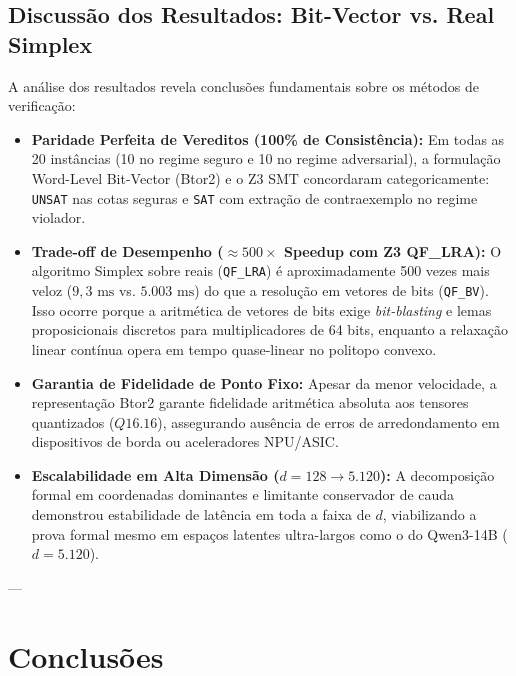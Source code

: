 \documentclass[11pt,a4paper]{article}
\theoremstyle{definition}
\begin{document}
\subsection{Discussão dos Resultados: Bit-Vector vs. Real Simplex}

A análise dos resultados revela conclusões fundamentais sobre os métodos de verificação:
\begin{itemize}
    \item \textbf{Paridade Perfeita de Vereditos (100\% de Consistência):} Em todas as 20 instâncias (10 no regime seguro e 10 no regime adversarial), a formulação Word-Level Bit-Vector (Btor2) e o Z3 SMT concordaram categoricamente: \texttt{UNSAT} nas cotas seguras e \texttt{SAT} com extração de contraexemplo no regime violador.
    \item \textbf{Trade-off de Desempenho ($\approx 500\times$ Speedup com Z3 QF\_LRA):} O algoritmo Simplex sobre reais (\texttt{QF\_LRA}) é aproximadamente 500 vezes mais veloz ($9{,}3\text{ ms}$ vs. $5.003\text{ ms}$) do que a resolução em vetores de bits (\texttt{QF\_BV}). Isso ocorre porque a aritmética de vetores de bits exige \textit{bit-blasting} e lemas proposicionais discretos para multiplicadores de 64 bits, enquanto a relaxação linear contínua opera em tempo quase-linear no politopo convexo.
    \item \textbf{Garantia de Fidelidade de Ponto Fixo:} Apesar da menor velocidade, a representação Btor2 garante fidelidade aritmética absoluta aos tensores quantizados ($Q16.16$), assegurando ausência de erros de arredondamento em dispositivos de borda ou aceleradores NPU/ASIC.
    \item \textbf{Escalabilidade em Alta Dimensão ($d=128 \to 5.120$):} A decomposição formal em coordenadas dominantes e limitante conservador de cauda demonstrou estabilidade de latência em toda a faixa de $d$, viabilizando a prova formal mesmo em espaços latentes ultra-largos como o do Qwen3-14B ($d=5.120$).
\end{itemize}

---

\section{Conclusões}
\end{document}
